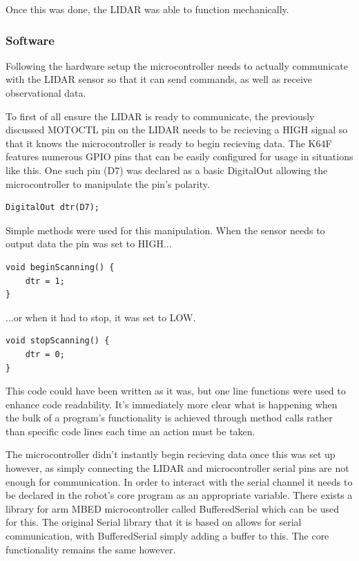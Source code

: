 				Once this was done, the LIDAR was able to function mechanically.
				
				\subsubsection{Software}
				Following the hardware setup the microcontroller needs to actually communicate with the LIDAR sensor so that it can send commands, as well as receive observational data.
				
				To first of all ensure the LIDAR is ready to communicate, the previously discussed MOTOCTL pin on the LIDAR needs to be recieving a HIGH signal so that it knows the microcontroller is ready to begin recieving data. The K64F features numerous GPIO pins that can be easily configured for usage in situations like this. One such pin (D7) was declared as a basic DigitalOut allowing the microcontroller to manipulate the pin's polarity.
				
				\begin{lstlisting}
DigitalOut dtr(D7);
				\end{lstlisting}
				
				Simple methods were used for this manipulation. When the sensor needs to output data the pin was set to HIGH...
				\begin{lstlisting}
void beginScanning() {
	dtr = 1;
}
				\end{lstlisting}
				
				...or when it had to stop, it was set to LOW.
				\begin{lstlisting}
void stopScanning() {
	dtr = 0;
}
				\end{lstlisting}
				This code could have been written as it was, but one line functions were used to enhance code readability. It's immediately more clear what is happening when the bulk of a program's functionality is achieved through method calls rather than specific code lines each time an action must be taken.  
				
				The microcontroller didn't instantly begin recieving data once this was set up however, as simply connecting the LIDAR and microcontroller serial pins are not enough for communication. In order to interact with the serial channel it needs to be declared in the robot's core program as an appropriate variable. There exists a library for arm MBED microcontroller called BufferedSerial which can be used for this. The original Serial library that it is based on allows for serial communication, with BufferedSerial simply adding a buffer to this. The core functionality remains the same however.
				

